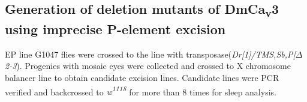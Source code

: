 \subsection*{Generation of deletion mutants of DmCa\textsubscript{v}3 using imprecise P-element excision}

EP line G1047 flies were crossed to the line with transposase(\emph{Dr[1]/TMS,Sb,P[$\Delta$2-3}). Progenies with mosaic eyes were collected and crossed to X chromosome balancer line to obtain candidate excision lines. Candidate lines were PCR verified and backcrossed to \emph{w\textsuperscript{1118}} for more than 8 times for sleep analysis.

  
  